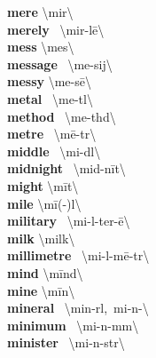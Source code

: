 \documentclass[10pt,a4paper]{article}
\begin{document}
\begin{multicols}{2}
\textbf{ mere }\quad \textbackslash \textprimstress mir\textbackslash \\
\textbf{ merely }\quad \ \textbackslash \textprimstress mir-l\={e}\textbackslash \\
\textbf{ mess }\quad \textbackslash \textprimstress mes\textbackslash \\
\textbf{ message }\quad \ \textbackslash \textprimstress me-sij\textbackslash \\
\textbf{ messy }\quad \textbackslash \textprimstress me-s\={e}\textbackslash \\
\textbf{ metal }\quad \ \textbackslash \textprimstress me-t\textsuperscript{\textreve}l\textbackslash \\
\textbf{ method }\quad \ \textbackslash \textprimstress me-th\textschwa d\textbackslash \\
\textbf{ metre }\quad \ \textbackslash \textprimstress m\={e}-t\textschwa r\textbackslash \\
\textbf{ middle }\quad \ \textbackslash \textprimstress mi-d\textsuperscript{\textreve}l\textbackslash \\
\textbf{ midnight }\quad \ \textbackslash \textprimstress mid-\textsecstress n\={i}t\textbackslash \\
\textbf{ might }\quad \textbackslash \textprimstress m\={i}t\textbackslash \\
\textbf{ mile }\quad \textbackslash \textprimstress m\={i}(-\textschwa )l\textbackslash \\
\textbf{ military }\quad \ \textbackslash \textprimstress mi-l\textschwa -\textsecstress ter-\={e}\textbackslash \\
\textbf{ milk }\quad \textbackslash \textprimstress milk\textbackslash \\
\textbf{ millimetre }\quad \ \textbackslash \textprimstress mi-l\textschwa -\textsecstress m\={e}-t\textschwa r\textbackslash \\
\textbf{ mind }\quad \textbackslash \textprimstress m\={i}nd\textbackslash \\
\textbf{ mine }\quad \textbackslash \textprimstress m\={i}n\textbackslash \\
\textbf{ mineral }\quad \ \textbackslash \textprimstress min-r\textschwa l,\ \textprimstress mi-n\textschwa -\textbackslash \\
\textbf{ minimum }\quad \ \textbackslash \textprimstress mi-n\textschwa -m\textschwa m\textbackslash \\
\textbf{ minister }\quad \ \textbackslash \textprimstress mi-n\textschwa -st\textschwa r\textbackslash \\

\end{multicols}
\end{document}
